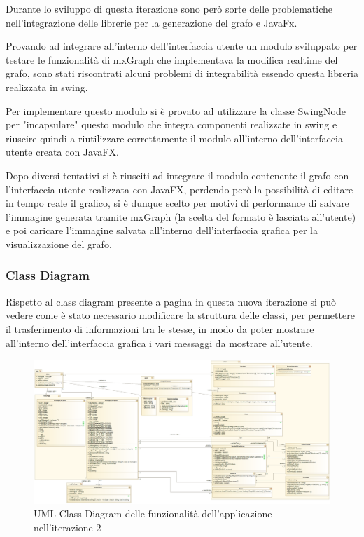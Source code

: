 \documentclass[12pt]{article}
\begin{document}
Durante lo sviluppo di questa iterazione sono però sorte delle problematiche nell'integrazione delle librerie per la generazione del grafo e JavaFx.\par
Provando ad integrare all'interno dell'interfaccia utente un modulo sviluppato per testare le funzionalità di mxGraph che implementava la modifica realtime del grafo, sono stati riscontrati alcuni problemi di integrabilità essendo questa libreria realizzata in swing.\par
Per implementare questo modulo si è provato ad utilizzare la classe SwingNode per "incapsulare" questo modulo che integra componenti realizzate in swing e riuscire quindi a riutilizzare correttamente il modulo all'interno dell'interfaccia utente creata con JavaFX.\par
Dopo diversi tentativi si è riusciti ad integrare il modulo contenente il grafo con l'interfaccia utente realizzata con JavaFX, perdendo però la possibilità di editare in tempo reale il grafico, si è dunque scelto per motivi di performance di salvare l'immagine generata tramite mxGraph (la scelta del formato è lasciata all'utente) e poi caricare l'immagine salvata all'interno dell'interfaccia grafica per la visualizzazione del grafo.

\subsubsection{Class Diagram}
Rispetto al class diagram presente a pagina \pageref{rifUMLV1} in questa nuova iterazione si può vedere come è stato necessario modificare la struttura delle classi, per permettere il trasferimento di informazioni tra le stesse, in modo da poter mostrare all'interno dell'interfaccia grafica i vari messaggi da mostrare all'utente.

\begin{figure}
\centering
\includegraphics[scale=0.3]{immagini/UMLV2.png}
\caption{UML Class Diagram delle funzionalità dell'applicazione nell'iterazione 2}
\end{figure}
\pagebreak
\end{document}
